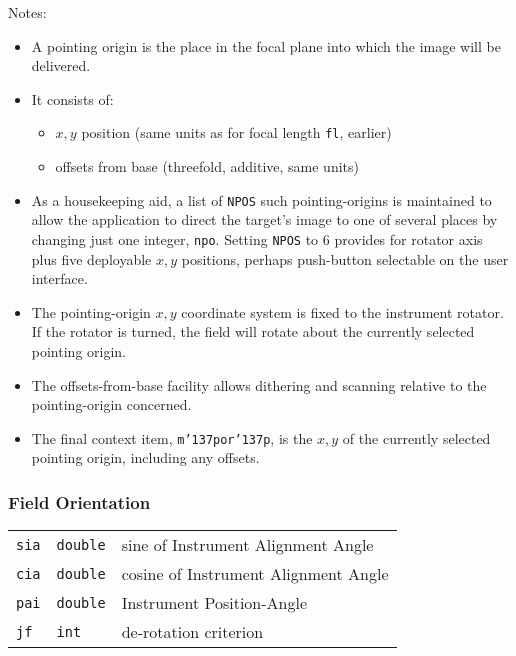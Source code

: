 \documentclass[12pt,fleqn,twoside]{article}
\renewcommand{\_}{{\tt\char'137}}     %
\newcommand{\notelist}  {\goodbreak \vspace{1ex} Notes:
                        \vspace{-3ex}}
\begin{document}
\notelist
\begin{itemize}
\item A pointing origin is the place in the focal plane
into
      which the image will be delivered.
\item It consists of:
      \begin{itemize}
      \item  $x,y$ position (same units as for focal length {\tt fl}, earlier)
      \item offsets from base (threefold, additive, same units)
      \end{itemize}
\item As a housekeeping aid, a list of {\tt NPOS} such pointing-origins is
      maintained to allow the application to direct the target's
      image to one of several places by changing just one integer,
      {\tt npo}.
      Setting {\tt NPOS} to 6 provides for rotator axis plus
      five deployable $x,y$ positions, perhaps push-button selectable
      on the user interface.
\item The pointing-origin $x,y$ coordinate system is fixed to the
      instrument rotator.  If the rotator is turned, the field will rotate
      about the currently selected pointing origin.
\item The offsets-from-base facility allows dithering and scanning
      relative to the pointing-origin concerned.
\item The final context item, {\tt m\_por\_p}, is the $x,y$ of the
      currently selected pointing origin, including any offsets.
\end{itemize}

\subsubsection{Field Orientation}
\label{fieldor}
\begin{tabular}{lll}
{\tt sia} & {\tt double} & sine of Instrument Alignment Angle \\
{\tt cia} & {\tt double} & cosine of Instrument Alignment Angle \\
{\tt pai} & {\tt double} & Instrument Position-Angle \\
{\tt jf}  & {\tt int}    & de-rotation criterion \\
\end{tabular}
\end{document}
